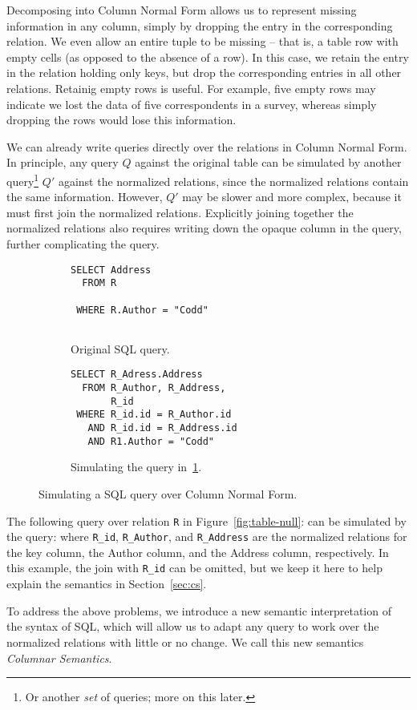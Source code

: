 \documentclass[sigconf]{acmart}
\begin{document}
Decomposing into Column Normal Form allows us to
 represent missing information in any column,
 simply by dropping the entry in the corresponding relation.
We even allow an entire tuple to be missing --
 that is, a table row with empty cells (as opposed to the absence of a row).
In this case, we retain the entry in the relation holding only keys, 
 but drop the corresponding entries in all other relations.
Retainig empty rows is useful.
For example, five empty rows may indicate we lost the data
 of five correspondents in a survey, 
 whereas simply dropping the rows would lose this information.

We can already write queries directly over the relations in Column Normal Form. 
In principle, any query $Q$ against the original table 
 can be simulated by another query\footnote{Or another {\em set} of queries; more on this later.}
 $Q'$ against the normalized relations, 
 since the normalized relations contain the same information.
However, $Q'$ may be slower and more complex,
 because it must first join the normalized relations.
Explicitly joining together the normalized relations
 also requires writing down the opaque column
 in the query, further complicating the query.

\begin{figure}
\begin{subfigure}[t]{0.4\linewidth}
\begin{lstlisting}[showlines=true]
SELECT Address 
  FROM R 

 WHERE R.Author = "Codd"


\end{lstlisting}
\caption{Original SQL query.}
\label{fig:codd}
\end{subfigure}
\;
\begin{subfigure}[t]{0.5\linewidth}
\begin{lstlisting}
SELECT R_Adress.Address 
  FROM R_Author, R_Address,
       R_id
 WHERE R_id.id = R_Author.id 
   AND R_id.id = R_Address.id
   AND R1.Author = "Codd"
\end{lstlisting}
\caption{Simulating the query in~\ref{fig:codd}.}
\end{subfigure}
\caption{Simulating a SQL query over Column Normal Form.}
\label{fig:simulate}
\end{figure}

\begin{example}
\label{ex:cnf-query}  
The following query over relation \lstinline|R| in Figure~\ref{fig:table-null}: 
%
%
can be simulated by the query:
%
%
where \lstinline|R_id|, \lstinline|R_Author|, and \lstinline|R_Address|
 are the normalized relations for the key column, 
 the \textsf{Author} column, and the \textsf{Address} column, respectively.
In this example, the join with \lstinline|R_id| can be omitted, 
 but we keep it here to help explain the semantics in Section~\ref{sec:cs}.
\end{example}
To address the above problems, 
 we introduce a new semantic interpretation of the syntax of SQL,
 which will allow us to adapt any query to work over 
 the normalized relations with little or no change.
We call this new semantics {\em Columnar Semantics}.
\end{document}
